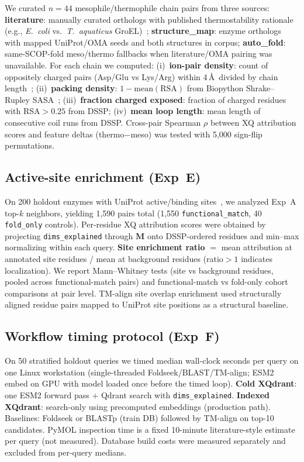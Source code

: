 \documentclass{ws-procs11x85}
\begin{document}
We curated $n=44$ mesophile/thermophile chain pairs from three sources: \textbf{literature}: manually curated orthologs with published thermostability rationale (e.g., \emph{E.\ coli} vs.\ \emph{T.\ aquaticus} GroEL)~\cite{jaenicke1985thermo,kumar2001thermo}; \textbf{structure\_map}: enzyme orthologs with mapped UniProt/OMA seeds and both structures in corpus; \textbf{auto\_fold}: same-SCOP-fold meso/thermo fallbacks when literature/OMA pairing was unavailable. For each chain we computed: (i)~\textbf{ion-pair density}: count of oppositely charged pairs (Asp/Glu vs Lys/Arg) within 4\,\AA\ divided by chain length~\cite{kumar2001thermo}; (ii)~\textbf{packing density}: $1 - \mathrm{mean(RSA)}$ from Biopython Shrake--Rupley SASA~\cite{shrake1973sasa}; (iii)~\textbf{fraction charged exposed}: fraction of charged residues with RSA${}>0.25$ from DSSP; (iv)~\textbf{mean loop length}: mean length of consecutive coil runs from DSSP. Cross-pair Spearman $\rho$ between XQ attribution scores and feature deltas (thermo$-$meso) was tested with 5,000 sign-flip permutations.

\subsection{Active-site enrichment (Exp~E)}

On 200 holdout enzymes with UniProt active/binding sites~\cite{uniprot2023}, we analyzed Exp~A top-$k$ neighbors, yielding 1,590 pairs total (1,550 \texttt{functional\_match}, 40 \texttt{fold\_only} controls). Per-residue XQ attribution scores were obtained by projecting \texttt{dims\_explained} through $\mathbf{M}$ onto DSSP-ordered residues and min--max normalizing within each query. \textbf{Site enrichment ratio} $=$ mean attribution at annotated site residues / mean at background residues (ratio${}>1$ indicates localization). We report Mann--Whitney tests (site vs background residues, pooled across functional-match pairs) and functional-match vs fold-only cohort comparisons at pair level. TM-align site overlap enrichment used structurally aligned residue pairs mapped to UniProt site positions as a structural baseline.

\subsection{Workflow timing protocol (Exp~F)}

On 50 stratified holdout queries we timed median wall-clock seconds per query on one Linux workstation (single-threaded Foldseek/BLAST/TM-align; ESM2 embed on GPU with model loaded once before the timed loop). \textbf{Cold XQdrant}: one ESM2 forward pass + Qdrant search with \texttt{dims\_explained}. \textbf{Indexed XQdrant}: search-only using precomputed embeddings (production path). Baselines: Foldseek or BLASTp (train DB) followed by TM-align on top-10 candidates. PyMOL inspection time is a fixed 10-minute literature-style estimate per query (not measured). Database build costs were measured separately and excluded from per-query medians.
\end{document}
